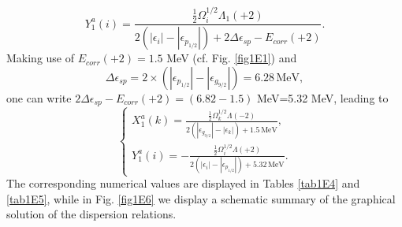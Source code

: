 \begin{equation*}
Y_1^a(i)=\frac{\frac{1}{2}\Omega_i^{1/2}\Lambda_1(+2)}{2(|\epsilon_i|-|\epsilon_{p_{1/2}}|)+2\Delta\epsilon_{sp}-E_{corr}(+2)}.
\end{equation*}
Making use of $E_{corr}(+2)=1.5$ MeV (cf. Fig. \ref{fig1E1}) and 
\begin{equation*}
\Delta\epsilon_{sp}=2\times(|\epsilon_{p_{1/2}}|-|\epsilon_{g_{9/2}}|)=6.28\,\text{MeV},
\end{equation*}
one can write $2\Delta\epsilon_{sp}-E_{corr}(+2)=(6.82-1.5)$ MeV=5.32 MeV, leading to
\begin{equation*}
\left\{\begin{array}{c}
X_1^a(k)=\frac{\frac{1}{2}\Omega_k^{1/2}\Lambda(-2)}{2(|\epsilon_{g_{9/2}}|-|\epsilon_k|)+1.5\,\text{MeV}}, \\ 
Y_1^a(i)=-\frac{\frac{1}{2}\Omega_i^{1/2}\Lambda(+2)}{2(|\epsilon_i|-|\epsilon_{p_{1/2}}|)+5.32\,\text{MeV}}.
\end{array}\right.
\end{equation*}
The corresponding numerical values are displayed in Tables \ref{tab1E4} and \ref{tab1E5}, while in Fig. \ref{fig1E6} we display a schematic summary of the graphical solution of the dispersion relations.


